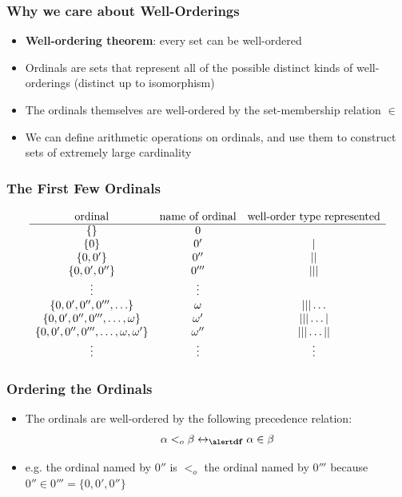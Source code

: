 \begin{frame}
\frametitle{Why we care about Well-Orderings}

\begin{itemize}[<+->]

\item \textbf{Well-ordering theorem}: every set can be well-ordered

\item Ordinals are sets that represent all of the possible distinct kinds of well-orderings (distinct up to isomorphism)

\item The ordinals themselves are well-ordered by the set-membership relation $\in$

\item We can define arithmetic operations on ordinals, and use them to construct sets of extremely large cardinality

\end{itemize}
\end{frame}

\begin{frame}
\frametitle{The First Few Ordinals}

\[
\begin{array}{ccc}
\text{ordinal} & \text{name of ordinal} & \text{well-order type represented}\\ \hline
\left\{ {} \right\} &0 & \ \\
\left\{ {0} \right\} &0'  & |   \\
\left\{ {0,0'} \right\} &0''  & | |  \\
\left\{ {0,0',0''} \right\} &0''' & | | |  \\
\vdots  & \vdots\\
\left\{ {0,0',0'',0''',\dots} \right\} &\omega  & | | |  \dots   \\
\left\{ {0,0',0'',0''',\dots,\omega} \right\} &\omega'  & | |  | \dots |  \\
\left\{ {0,0',0'',0''',\dots,\omega, \omega'} \right\} &\omega''  & | | | \dots | |  \\
\vdots & \vdots & \vdots \\
\end{array}
\]

\end{frame}

\begin{frame}
\frametitle{Ordering the Ordinals}

\begin{itemize}[<+->]

\item The ordinals are well-ordered by the following precedence relation:
$$\alpha <_o \beta \leftrightarrow_{\text{\emph{df}}} \alpha \in \beta$$

\item e.g. the ordinal named by $0''$ is $<_o$ the ordinal named by $0'''$ because $0'' \in 0''' = \{0, 0', 0'' \}$

\end{itemize}
\end{frame}

